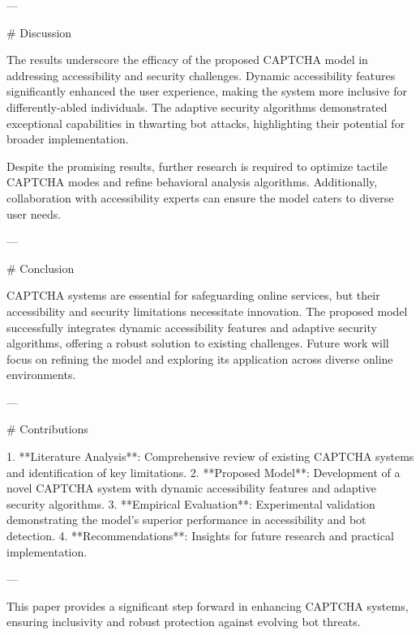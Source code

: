 ---

# Discussion  

The results underscore the efficacy of the proposed CAPTCHA model in addressing accessibility and security challenges. Dynamic accessibility features significantly enhanced the user experience, making the system more inclusive for differently-abled individuals. The adaptive security algorithms demonstrated exceptional capabilities in thwarting bot attacks, highlighting their potential for broader implementation.  

Despite the promising results, further research is required to optimize tactile CAPTCHA modes and refine behavioral analysis algorithms. Additionally, collaboration with accessibility experts can ensure the model caters to diverse user needs.  

---

# Conclusion  

CAPTCHA systems are essential for safeguarding online services, but their accessibility and security limitations necessitate innovation. The proposed model successfully integrates dynamic accessibility features and adaptive security algorithms, offering a robust solution to existing challenges. Future work will focus on refining the model and exploring its application across diverse online environments.  

---

# Contributions  

1. **Literature Analysis**: Comprehensive review of existing CAPTCHA systems and identification of key limitations.  
2. **Proposed Model**: Development of a novel CAPTCHA system with dynamic accessibility features and adaptive security algorithms.  
3. **Empirical Evaluation**: Experimental validation demonstrating the model's superior performance in accessibility and bot detection.  
4. **Recommendations**: Insights for future research and practical implementation.  

--- 

This paper provides a significant step forward in enhancing CAPTCHA systems, ensuring inclusivity and robust protection against evolving bot threats.